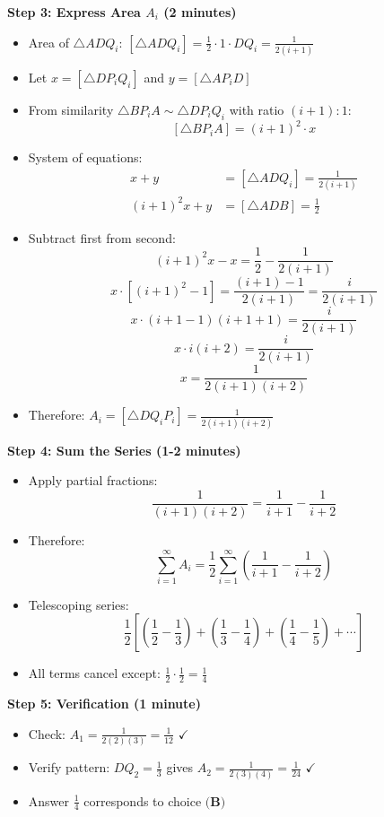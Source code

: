 \documentclass[]{article}
\begin{document}
\begin{solutionbox}
\textbf{Step 3: Express Area $A_i$ (2 minutes)}
\begin{itemize}
    \item Area of $\triangle ADQ_i$: $[\triangle ADQ_i] = \frac{1}{2} \cdot 1 \cdot DQ_i = \frac{1}{2(i+1)}$
    \item Let $x = [\triangle DP_iQ_i]$ and $y = [\triangle AP_iD]$
    \item From similarity $\triangle BP_iA \sim \triangle DP_iQ_i$ with ratio $(i+1):1$:
    \[[\triangle BP_iA] = (i+1)^2 \cdot x\]
    \item System of equations:
    \begin{align*}
        x + y &= [\triangle ADQ_i] = \frac{1}{2(i+1)} \\
        (i+1)^2 x + y &= [\triangle ADB] = \frac{1}{2}
    \end{align*}
    \item Subtract first from second:
    \[(i+1)^2 x - x = \frac{1}{2} - \frac{1}{2(i+1)}\]
    \[x \cdot [(i+1)^2 - 1] = \frac{(i+1) - 1}{2(i+1)} = \frac{i}{2(i+1)}\]
    \[x \cdot (i+1-1)(i+1+1) = \frac{i}{2(i+1)}\]
    \[x \cdot i(i+2) = \frac{i}{2(i+1)}\]
    \[x = \frac{1}{2(i+1)(i+2)}\]
    \item Therefore: $A_i = [\triangle DQ_iP_i] = \frac{1}{2(i+1)(i+2)}$
\end{itemize}

\textbf{Step 4: Sum the Series (1-2 minutes)}
\begin{itemize}
    \item Apply partial fractions:
    \[\frac{1}{(i+1)(i+2)} = \frac{1}{i+1} - \frac{1}{i+2}\]
    \item Therefore:
    \[\sum_{i=1}^{\infty} A_i = \frac{1}{2} \sum_{i=1}^{\infty} \left(\frac{1}{i+1} - \frac{1}{i+2}\right)\]
    \item Telescoping series:
    \[\frac{1}{2}\left[\left(\frac{1}{2} - \frac{1}{3}\right) + \left(\frac{1}{3} - \frac{1}{4}\right) + \left(\frac{1}{4} - \frac{1}{5}\right) + \cdots\right]\]
    \item All terms cancel except: $\frac{1}{2} \cdot \frac{1}{2} = \frac{1}{4}$
\end{itemize}

\textbf{Step 5: Verification (1 minute)}
\begin{itemize}
    \item Check: $A_1 = \frac{1}{2(2)(3)} = \frac{1}{12}$ $\checkmark$
    \item Verify pattern: $DQ_2 = \frac{1}{3}$ gives $A_2 = \frac{1}{2(3)(4)} = \frac{1}{24}$ $\checkmark$
    \item Answer $\boxed{\frac{1}{4}}$ corresponds to choice $\textbf{(B)}$
\end{itemize}


\end{solutionbox}
\end{document}
